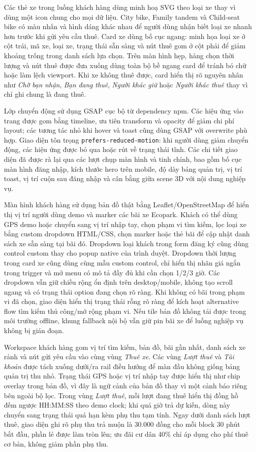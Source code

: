 Các thẻ xe trong luồng khách hàng dùng minh hoạ SVG theo loại xe thay vì dùng
một icon chung cho mọi dữ liệu. City bike, Family tandem và Child-seat bike có
màu nhấn và hình dáng khác nhau để người dùng nhận biết loại xe nhanh hơn trước
khi gửi yêu cầu thuê. Card xe dùng bố cục ngang: minh họa loại xe ở cột trái, mã
xe, loại xe, trạng thái sẵn sàng và nút thuê gom ở cột phải để giảm khoảng trống
trong danh sách lựa chọn. Trên màn hình hẹp, hàng chọn thời lượng và nút thuê
được đưa xuống dùng toàn bộ bề ngang card để tránh bó chữ hoặc làm lệch viewport.
Khi xe không thuê được, card hiển thị rõ nguyên nhân như \textit{Chờ bạn nhận},
\textit{Bạn đang thuê}, \textit{Người khác giữ} hoặc \textit{Người khác thuê}
thay vì chỉ ghi chung là đang thuê.

Lớp chuyển động sử dụng GSAP cục bộ từ dependency npm. Các hiệu ứng vào trang được
gom bằng timeline, ưu tiên transform và opacity để giảm chi phí layout; các tương
tác nhỏ khi hover và toast cũng dùng GSAP với overwrite phù hợp. Giao diện tôn trọng
\texttt{prefers-reduced-motion}: khi người dùng giảm chuyển động, các hiệu ứng
được bỏ qua hoặc rút về trạng thái tĩnh. Các chi tiết giao diện đã được rà lại qua
các lượt chụp màn hình và tinh chỉnh, bao gồm bố cục màn hình đăng nhập, kích thước
hero trên mobile, độ dày bảng quản trị, vị trí toast, vị trí cuộn sau đăng nhập và cân
bằng giữa scene 3D với nội dung nghiệp vụ.

Màn hình khách hàng sử dụng bản đồ thật bằng Leaflet/OpenStreetMap để hiển thị
vị trí người dùng demo và marker các bãi xe Ecopark. Khách có thể dùng GPS demo
hoặc chuyển sang vị trí nhập tay, chọn phạm vi tìm kiếm, lọc loại xe bằng custom
dropdown HTML/CSS, chọn marker hoặc thẻ bãi để cập nhật danh sách xe sẵn sàng
tại bãi đó. Dropdown loại khách trong form đăng ký cũng dùng control custom thay
cho popup native của trình duyệt. Dropdown thời lượng trong card xe cũng dùng
cùng mẫu custom control, chỉ hiển thị nhãn giá ngắn trong trigger và mở menu có
mô tả đầy đủ khi cần chọn 1/2/3 giờ. Các dropdown vẫn giữ chiều rộng ổn định trên
desktop/mobile, không tạo scroll ngang và có trạng thái option đang chọn rõ ràng.
Khi không có bãi trong phạm vi đã chọn, giao diện hiển thị trạng thái rỗng rõ ràng để kích hoạt
alternative flow tìm kiếm thủ công/mở rộng phạm vi. Nếu tile bản đồ
không tải được trong môi trường offline, khung fallback nội bộ vẫn giữ pin bãi xe
để luồng nghiệp vụ không bị gián đoạn.

Workspace khách hàng gom vị trí tìm kiếm, bản đồ, bãi gần nhất, danh sách xe rảnh
và nút gửi yêu cầu vào cùng vùng \textit{Thuê xe}. Các vùng \textit{Lượt thuê}
và \textit{Tài khoản} được tách xuống dưới/ra rail điều hướng để màn đầu không
giống bảng quản trị thu nhỏ. Trạng thái GPS hoặc vị trí nhập tay được hiển thị
như chip overlay trong bản đồ, vì đây là ngữ cảnh của bản đồ thay vì một cảnh báo
riêng bên ngoài bộ lọc. Trong vùng \textit{Lượt thuê}, mỗi lượt đang thuê hiển
thị đồng hồ đếm ngược HH:MM:SS theo demo clock; khi quá giờ trả dự kiến, dòng
này chuyển sang trạng thái quá hạn kèm phụ thu tạm tính. Ngay dưới danh sách
lượt thuê, giao diện ghi rõ phụ thu trả muộn là 30.000 đồng cho mỗi block 30
phút bắt đầu, phần lẻ được làm tròn lên; ưu đãi cư dân 40\% chỉ áp dụng cho phí
thuê cơ bản, không giảm phần phụ thu.

